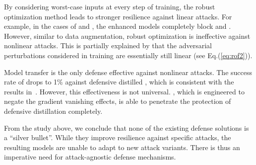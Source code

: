 By considering worst-case inputs at every step of training, the robust optimization method leads to stronger resilience against linear attacks. For example, in the cases of \mnist and \svhn, the enhanced \dnn models completely block \ttg and \ttha.
 However, similar to data augmentation, robust optimization is ineffective against nonlinear attacks. This is partially explained by that the adversarial perturbations considered in training are essentially still linear (see Eq.(\ref{eq:rof2})).


Model transfer is the only defense effective against nonlinear attacks. The success rate of \ttpa drops to 1\% against defensive distilled \cnn, which is consistent with the results in~\cite{Papernot:2016:sp}. However, this effectiveness is not universal. %
\ttca, which is engineered to negate the gradient vanishing effects, is able to penetrate the protection of defensive distillation completely.

From the study above, we conclude that none of the existing defense solutions is a ``silver bullet''. While they improve \dnn resilience against specific attacks, the resulting models are unable to adapt to new attack variants. There is thus an imperative need for attack-agnostic defense mechanisms.
